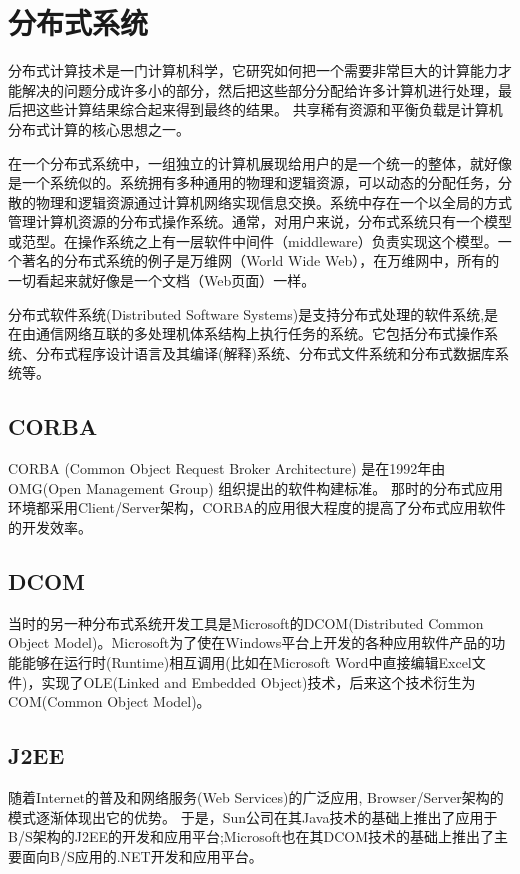 \section{分布式系统}

分布式计算技术是一门计算机科学，它研究如何把一个需要非常巨大的计算能力才能解决的问题分成许多小的部分，然后把这些部分分配给许多计算机进行处理，最后把这些计算结果综合起来得到最终的结果。
共享稀有资源和平衡负载是计算机分布式计算的核心思想之一。

在一个分布式系统中，一组独立的计算机展现给用户的是一个统一的整体，就好像是一个系统似的。系统拥有多种通用的物理和逻辑资源，可以动态的分配任务，分散的物理和逻辑资源通过计算机网络实现信息交换。系统中存在一个以全局的方式管理计算机资源的分布式操作系统。通常，对用户来说，分布式系统只有一个模型或范型。在操作系统之上有一层软件中间件（middleware）负责实现这个模型。一个著名的分布式系统的例子是万维网（World Wide Web），在万维网中，所有的一切看起来就好像是一个文档（Web页面）一样。

分布式软件系统(Distributed Software Systems)是支持分布式处理的软件系统,是在由通信网络互联的多处理机体系结构上执行任务的系统。它包括分布式操作系统、分布式程序设计语言及其编译(解释)系统、分布式文件系统和分布式数据库系统等。

\subsection{CORBA}
CORBA (Common Object Request Broker Architecture) 是在1992年由OMG(Open Management Group) 组织提出的软件构建标准。
那时的分布式应用环境都采用Client/Server架构，CORBA的应用很大程度的提高了分布式应用软件的开发效率。

\subsection{DCOM}
当时的另一种分布式系统开发工具是Microsoft的DCOM(Distributed Common Object Model)。Microsoft为了使在Windows平台上开发的各种应用软件产品的功能能够在运行时(Runtime)相互调用(比如在Microsoft Word中直接编辑Excel文件)，实现了OLE(Linked and Embedded Object)技术，后来这个技术衍生为COM(Common Object Model)。

\subsection{J2EE}
随着Internet的普及和网络服务(Web Services)的广泛应用, Browser/Server架构的模式逐渐体现出它的优势。 于是，Sun公司在其Java技术的基础上推出了应用于B/S架构的J2EE的开发和应用平台;Microsoft也在其DCOM技术的基础上推出了主要面向B/S应用的.NET开发和应用平台。

